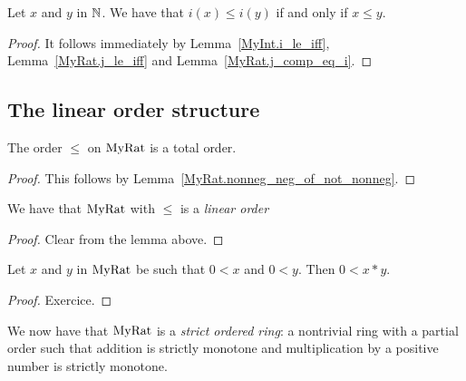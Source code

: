 \begin{lemma}
    \label{MyRat.i_le_iff}
    \leanok
    Let $x$ and $y$ in $\mathbb{N}$. We have that $i(x) \leq i(y)$ if and only if $x \leq y$.
\end{lemma}
\begin{proof}
    \leanok
    It follows immediately by Lemma~\ref{MyInt.i_le_iff}, Lemma~\ref{MyRat.j_le_iff} and Lemma~\ref{MyRat.j_comp_eq_i}.
\end{proof}

\subsection{The linear order structure}

\begin{lemma}
    \label{MyRat.le_total}
    \leanok
    The order $\leq$ on $\mathrm{MyRat}$ is a total order.
\end{lemma}
\begin{proof}
    \leanok
This follows by Lemma~\ref{MyRat.nonneg_neg_of_not_nonneg}.
\end{proof}

\begin{lemma}
    \label{MyRat.linearOrder}
    \leanok
    We have that $\mathrm{MyRat}$ with $\leq$ is a \emph{linear order}
\end{lemma}
\begin{proof}
    \leanok
    Clear from the lemma above.
\end{proof}

\begin{lemma}
    \label{MyRat.mul_pos}
    \leanok
    Let $x$ and $y$ in $\mathrm{MyRat}$ be such that $0 < x$ and $0 < y$. Then $0 < x * y$.
\end{lemma}
\begin{proof}
    \leanok
Exercice.
\end{proof}

We now have that $\mathrm{MyRat}$ is a \emph{strict ordered ring}: a nontrivial ring with a partial order such that addition is strictly monotone and multiplication by a positive number is strictly monotone.